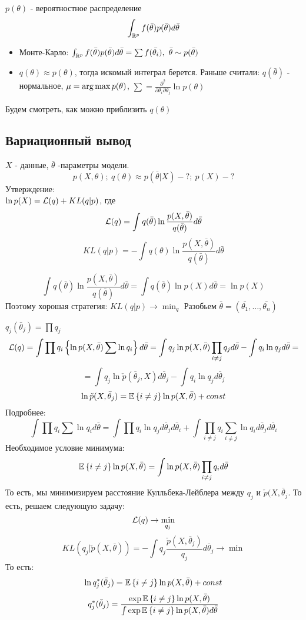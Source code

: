 $p(\theta)$ - вероятностное распределение \\
$$ \int_{\mathbb{R}^p} f(\bar{\theta}) p(\bar{\theta}) d\bar{\theta} $$

\begin{itemize}
	\item Монте-Карло: $ \int_{\mathbb{R}^p} f(\bar{\theta}) p(\bar{\theta}) d\bar{\theta} = \sum f(\bar{\theta_i}), \ \bar{\theta} \sim p(\bar{\theta})$
	\item $ q(\theta) \approx p(\theta)$, тогда искомый интеграл берется. Раньше считали: $q(\bar{\theta})$ - нормальное, $\mu = \arg\max p(\theta)$, $\sum = \frac{\partial^2}{\partial \theta_i \partial \theta_j} \ln p(\theta)$
\end{itemize}
Будем смотреть, как можно приблизить $q(\theta)$
\subsection*{Вариационный вывод} 
$X$ - данные, $\bar{\theta}$ -параметры модели.
$$ p(X, \theta); \ q(\theta) \approx p(\bar{\theta}|X) - ?; \ p(X) - ? $$
Утверждение: \\
$\ln p(X) = \mathcal{L}(q) + KL(q|p)$, где 
$$\mathcal{L}(q) = \int q(\bar{\theta}) \ln \frac{p(X, \bar{\theta})}{q(\bar{\theta})} d\bar{\theta} $$
$$ KL(q|p) = -\int q(\theta) \ln \frac{p(X, \bar{\theta})}{q(\bar{\theta})} d\bar{\theta} $$

$$ \int q(\bar{\theta}) \ln \frac{p(X, \bar{\theta})}{q(\bar{\theta})} d\bar{\theta}  = \int q(\bar{\theta}) \ln p(X) d\bar{\theta} = \ln p(X) $$
Поэтому хорошая стратегия: $KL(q|p) \to \min_q$
Разобьем $\bar{\theta} = (\bar{\theta_1}, \ldots, \bar{\theta_n})$

$q_j(\bar{\theta}_j) = \prod q_j$
$$ \mathcal{L}(q) = \int \prod q_i \left\{ \ln p(X, \bar{\theta}) \sum \ln q_i \right\}d\bar{\theta} = \int q_j \ln p(X, \bar{\theta})\prod_{i \neq j} q_j d\bar{\theta} - \int q_i \ln q_j d\bar{\theta} =$$
$$ = \int q_j \ln \check{p}(\bar{\theta}_j, X)d\bar{\theta}_j - \int q_i \ln q_j d\bar{\theta}_j $$
$$ \ln \check{p}(X, \bar{\theta}_j) = \mathbb{E}\left\{ i \neq j \right\} \ln p(X, \bar{\theta}) + const $$
Подробнее: 
$$ \int \prod q_i \sum \ln q_i d\bar{\theta} = \int \prod q_i \ln q_j d\bar{\theta}_j d\bar{\theta}_i + \int \prod_{i \neq j} q_i \sum_{i \neq j} \ln q_i d\bar{\theta}_j d\bar{\theta}_i$$
Необходимое условие минимума:
$$ \mathbb{E}\left\{ i \neq j \right\} \ln p(X, \bar{\theta}) = \int \ln p(X, \bar{\theta}) \prod_{i \neq j} q_i d\bar{\theta} $$
То есть, мы минимизируем расстояние Кулльбека-Лейблера между $q_j$ и $\check{p}(X, \bar{\theta}_j$. То есть, решаем следующую задачу:
$$ \mathcal{L}(q) \to \min_{q_j} $$
$$ KL(q_j|\check{p}(X, \bar{\theta})) = - \int q_j \frac{\check{p}(X, \bar{\theta}_j)}{q_j} d\bar{\theta}_j \to \min$$
То есть: 
$$ \ln q_j^*(\bar{\theta}_j) = \mathbb{E}\left\{ i \neq j \right\} \ln p(X, \bar{\theta}) + const $$
$$ q_j^*(\bar{\theta}_j) = \frac{\exp{\mathbb{E}\left\{ i \neq j \right\}{\ln p(X, \bar{\theta})}}}{\int \exp{\mathbb{E}\left\{ i \neq j \right\}{\ln p(X, \bar{\theta}) d\bar{\theta}}}} $$

